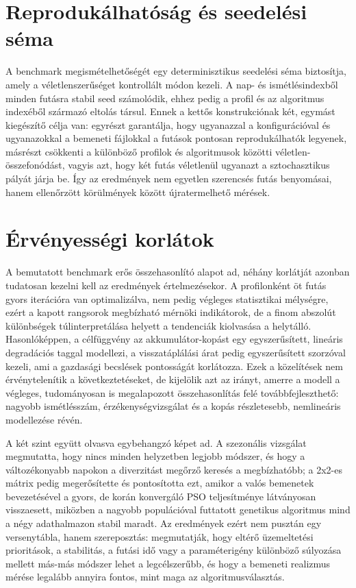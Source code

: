 \section{Reprodukálhatóság és seedelési séma}
A benchmark megismételhetőségét egy determinisztikus seedelési séma biztosítja, amely a véletlenszerűséget kontrollált módon kezeli. A nap- és ismétlésindexből minden futásra stabil seed számolódik, ehhez pedig a profil és az algoritmus indexéből származó eltolás társul. Ennek a kettős konstrukciónak két, egymást kiegészítő célja van: egyrészt garantálja, hogy ugyanazzal a konfigurációval és ugyanazokkal a bemeneti fájlokkal a futások pontosan reprodukálhatók legyenek, másrészt csökkenti a különböző profilok és algoritmusok közötti véletlen-összefonódást, vagyis azt, hogy két futás véletlenül ugyanazt a sztochasztikus pályát járja be. Így az eredmények nem egyetlen szerencsés futás benyomásai, hanem ellenőrzött körülmények között újratermelhető mérések.

\section{Érvényességi korlátok}
A bemutatott benchmark erős összehasonlító alapot ad, néhány korlátját azonban tudatosan kezelni kell az eredmények értelmezésekor. A profilonként öt futás gyors iterációra van optimalizálva, nem pedig végleges statisztikai mélységre, ezért a kapott rangsorok megbízható mérnöki indikátorok, de a finom abszolút különbségek túlinterpretálása helyett a tendenciák kiolvasása a helytálló. Hasonlóképpen, a célfüggvény az akkumulátor-kopást egy egyszerűsített, lineáris degradációs taggal modellezi, a visszatáplálási árat pedig egyszerűsített szorzóval kezeli, ami a gazdasági becslések pontosságát korlátozza. Ezek a közelítések nem érvénytelenítik a következtetéseket, de kijelölik azt az irányt, amerre a modell a végleges, tudományosan is megalapozott összehasonlítás felé továbbfejleszthető: nagyobb ismétlésszám, érzékenységvizsgálat és a kopás részletesebb, nemlineáris modellezése révén.

A két szint együtt olvasva egybehangzó képet ad. A szezonális vizsgálat megmutatta, hogy nincs minden helyzetben legjobb módszer, és hogy a változékonyabb napokon a diverzitást megőrző keresés a megbízhatóbb; a 2x2-es mátrix pedig megerősítette és pontosította ezt, amikor a valós bemenetek bevezetésével a gyors, de korán konvergáló PSO teljesítménye látványosan visszaesett, miközben a nagyobb populációval futtatott genetikus algoritmus mind a négy adathalmazon stabil maradt. Az eredmények ezért nem pusztán egy versenytábla, hanem szereposztás: megmutatják, hogy eltérő üzemeltetési prioritások, a stabilitás, a futási idő vagy a paraméterigény különböző súlyozása mellett más-más módszer lehet a legcélszerűbb, és hogy a bemeneti realizmus mérése legalább annyira fontos, mint maga az algoritmusválasztás.
